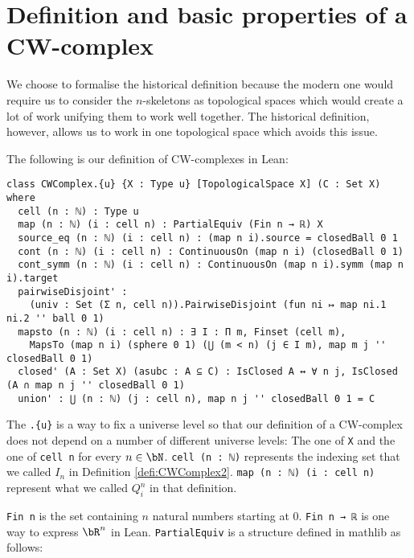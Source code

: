 \section{Definition and basic properties of a CW-complex}

We choose to formalise the historical definition because the modern one would require us to consider the $n$-skeletons as topological spaces which would create a lot of work unifying them to work well together. 
The historical definition, however, allows us to work in one topological space which avoids this issue.  

The following is our definition of CW-complexes in Lean: 
\href{https://github.com/scholzhannah/CWComplexes/blob/7be4872a05b534011cc969eb5b80a4b7f0bf57e2/CWcomplexes/Definition.lean#L47-L76}{\faExternalLink}

\begin{lstlisting}
class CWComplex.{u} {X : Type u} [TopologicalSpace X] (C : Set X) where
  cell (n : ℕ) : Type u
  map (n : ℕ) (i : cell n) : PartialEquiv (Fin n → ℝ) X
  source_eq (n : ℕ) (i : cell n) : (map n i).source = closedBall 0 1
  cont (n : ℕ) (i : cell n) : ContinuousOn (map n i) (closedBall 0 1)
  cont_symm (n : ℕ) (i : cell n) : ContinuousOn (map n i).symm (map n i).target
  pairwiseDisjoint' :
    (univ : Set (Σ n, cell n)).PairwiseDisjoint (fun ni ↦ map ni.1 ni.2 '' ball 0 1)
  mapsto (n : ℕ) (i : cell n) : ∃ I : Π m, Finset (cell m),
    MapsTo (map n i) (sphere 0 1) (⋃ (m < n) (j ∈ I m), map m j '' closedBall 0 1)
  closed' (A : Set X) (asubc : A ⊆ C) : IsClosed A ↔ ∀ n j, IsClosed (A ∩ map n j '' closedBall 0 1)
  union' : ⋃ (n : ℕ) (j : cell n), map n j '' closedBall 0 1 = C
\end{lstlisting}

The \lstinline|.{u}| is a way to fix a universe level so that our definition of a CW-complex does not depend on a number of different universe levels: The one of \lstinline{X} and the one of \lstinline{cell n} for every $n \in \bN$.
\lstinline{cell (n : ℕ)} represents the indexing set that we called $I_n$ in Definition \ref{defi:CWComplex2}. \lstinline{map (n : ℕ) (i : cell n)} represent what we called $Q_i^n$ in that definition.

\lstinline{Fin n}
\href{https://github.com/leanprover/lean4/blob/0edf1bac392f7e2fe0266b28b51c498306363a84/src/Init/Prelude.lean#L1826-L1838}{\faExternalLink} 
is the set containing $n$ natural numbers starting at 0.
\lstinline{Fin n → ℝ} is one way to express $\bR^n$ in Lean.
\lstinline{PartialEquiv} is a structure defined in mathlib as follows: 
\href{https://github.com/leanprover-community/mathlib4/blob/ed125a4216d18273cb1b96d4c846d32b85d74faf/Mathlib/Logic/Equiv/PartialEquiv.lean#L113-L134}{\faExternalLink}

